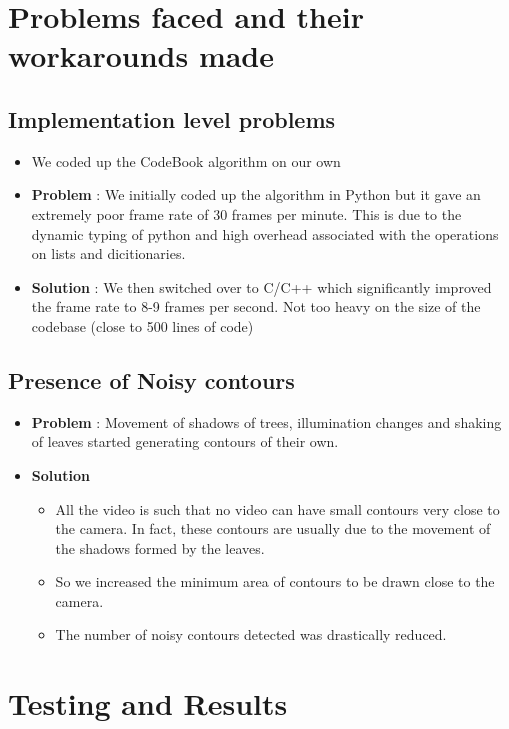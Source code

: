 \documentclass[12pt,a4paper]{article}
\begin{document}
\section{Problems faced and their workarounds made}
\subsection{Implementation level problems}
\begin{itemize}
\item We coded up the CodeBook algorithm on our own
\item \textbf{Problem} : We initially coded up the algorithm in Python but it gave an extremely poor frame rate of 30 frames per minute. This is due to the dynamic typing of python and high overhead associated with the operations on lists and dicitionaries. 
\item \textbf{Solution} : We then switched over to C/C++ which significantly improved the frame rate to 8-9 frames per second. Not too heavy on the size of the codebase (close to 500 lines of code)
\end{itemize}

\subsection{Presence of Noisy contours}
\begin{itemize}
\item \textbf{Problem} : Movement of shadows of trees, illumination changes and shaking of leaves started generating contours of their own.
\item \textbf{Solution}
    \begin{itemize}
    \item All the video is such that no video can have small contours very close to the camera. In fact, these contours are usually due to the movement of the shadows formed by the leaves.
    \item So we increased the minimum area of contours to be drawn close to the camera.
    \item The number of noisy contours detected was drastically reduced.
    \end{itemize}
\end{itemize}

\section{Testing and Results}
\end{document}
